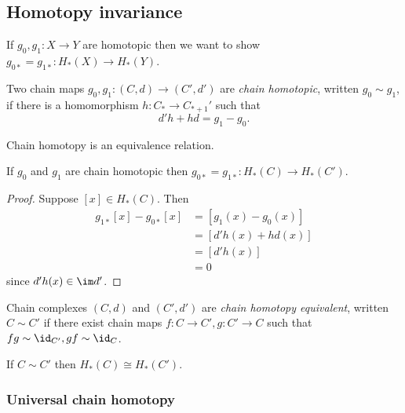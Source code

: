 \documentclass[a4paper]{article}
\begin{document}
\subsection{Homotopy invariance}

If \(g_0, g_1: X \to Y\) are homotopic then we want to show \(g_{0*} = g_{1*}: H_*(X) \to H_*(Y)\).

\begin{definition}
  Two chain maps \(g_0, g_1: (C, d) \to (C', d')\) are \emph{chain homotopic}, written \(g_0 \sim g_1\), if there is a homomorphism \(h: C_* \to C_{* + 1}'\) such that
  \[
    d'h + hd = g_1 - g_0.
  \]
\end{definition}

\begin{lemma}
  Chain homotopy is an equivalence relation.
\end{lemma}

\begin{proposition}
  If \(g_0\) and \(g_1\) are chain homotopic then \(g_{0*} = g_{1*}: H_*(C) \to H_*(C')\).
\end{proposition}

\begin{proof}
  Suppose \([x] \in H_*(C)\). Then
  \begin{align*}
    g_{1*}[x] - g_{0*}[x]
    &= [g_1(x) - g_0(x)] \\
    &= [d'h(x) + hd(x)] \\
    &= [d'h(x)] \\
    &= 0
  \end{align*}
  since \(d'h(x) \in \im d'\).
\end{proof}

\begin{definition}
  Chain complexes \((C, d)\) and \((C', d')\) are \emph{chain homotopy equivalent}, written \(C \sim C'\) if there exist chain maps \(f: C \to C', g: C' \to C\) such that \(fg \sim \id_{C'}, gf \sim \id_C\).
\end{definition}

\begin{ex}
  If \(C \sim C'\) then \(H_*(C) \cong H_*(C')\).
\end{ex}

\subsubsection{Universal chain homotopy}
\end{document}
